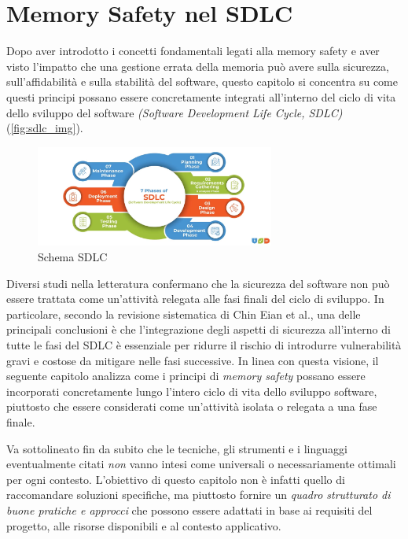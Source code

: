 \chapter{Memory Safety nel SDLC}
\label{cha:sdlc}

Dopo aver introdotto i concetti fondamentali legati alla memory safety e aver
visto l'impatto che una gestione errata della memoria può avere sulla sicurezza,
sull'affidabilità e sulla stabilità del software, questo capitolo si concentra
su come questi principi possano essere concretamente integrati all'interno del
ciclo di vita dello sviluppo del software \textit{(Software Development Life Cycle,
SDLC)}(\autoref{fig:sdlc_img}).

\begin{figure}[htbp]
  \centering
  \includegraphics[width=0.7\textwidth]{images/sdlc.png}
  \caption[Schema SDLC]{Schema SDLC\protect\footnotemark}
  \label{fig:sdlc_img}
\end{figure}

Diversi studi nella letteratura confermano che la sicurezza del software non può
essere trattata come un'attività relegata alle fasi finali del ciclo di sviluppo.
In particolare, secondo la revisione sistematica di Chin Eian et al.\cite{security_in_sdlc},
una delle principali conclusioni è che l'integrazione degli aspetti di sicurezza
all'interno di tutte le fasi del SDLC è essenziale per ridurre il rischio di
introdurre vulnerabilità gravi e costose da mitigare nelle fasi successive. In linea
con questa visione, il seguente capitolo analizza come i principi di \textit{memory
safety} possano essere incorporati concretamente lungo l'intero ciclo di vita dello
sviluppo software, piuttosto che essere considerati come un'attività isolata o
relegata a una fase finale.

Va sottolineato fin da subito che le tecniche, gli strumenti e i linguaggi eventualmente
citati \textit{non} vanno intesi come universali o necessariamente ottimali per
ogni contesto. L'obiettivo di questo capitolo non è infatti quello di raccomandare
soluzioni specifiche, ma piuttosto fornire un \textit{quadro strutturato di
buone pratiche e approcci} che possono essere adattati in base ai requisiti del progetto,
alle risorse disponibili e al contesto applicativo.





